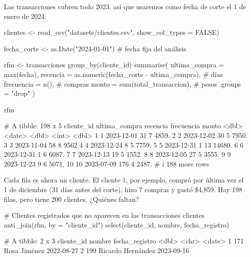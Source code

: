 Las transacciones cubren todo 2023, así que usaremos como fecha de corte el
1 de enero de 2024:

\begin{rcode}
clientes <- read_csv("datasets/clientes.csv", show_col_types = FALSE)

fecha_corte <- as.Date("2024-01-01")   # fecha fija del análisis

rfm <- transacciones %
  group_by(cliente_id) %
  summarise(
    ultima_compra = max(fecha),
    recencia   = as.numeric(fecha_corte - ultima_compra),  # días
    frecuencia = n(),                                      # compras
    monto      = sum(total_transaccion),                   # pesos
    .groups = "drop"
  )

rfm
\end{rcode}

\begin{rsalida}
# A tibble: 198 x 5
   cliente_id ultima_compra recencia frecuencia  monto
        <dbl> <date>           <dbl>      <int>  <dbl>
 1          1 2023-12-01          31          7  4859.
 2          2 2023-12-02          30          5  7950.
 3          3 2023-11-04          58          8  9562 
 4          4 2023-12-24           8          5  7759.
 5          5 2023-12-31           1         13 14680.
 6          6 2023-12-31           1          6  6087.
 7          7 2023-12-13          19          5  1552.
 8          8 2023-12-05          27          5  3555.
 9          9 2023-12-23           9          6  5071.
10         10 2023-07-09         176          4  2487.
# i 188 more rows
\end{rsalida}

Cada fila es ahora un cliente. El cliente 1, por ejemplo, compró por última vez
el 1 de diciembre (31 días antes del corte), hizo 7 compras y gastó \$4{,}859.
Hay 198 filas, pero  tiene 200 clientes. ¿Quiénes faltan?

\begin{rcode}
# Clientes registrados que no aparecen en las transacciones
clientes %
  anti_join(rfm, by = "cliente_id") %
  select(cliente_id, nombre, fecha_registro)
\end{rcode}

\begin{rsalida}
# A tibble: 2 x 3
  cliente_id nombre            fecha_registro
       <dbl> <chr>             <date>        
1        171 Rosa Jiménez      2022-08-27    
2        199 Ricardo Hernández 2023-09-16    
\end{rsalida}

